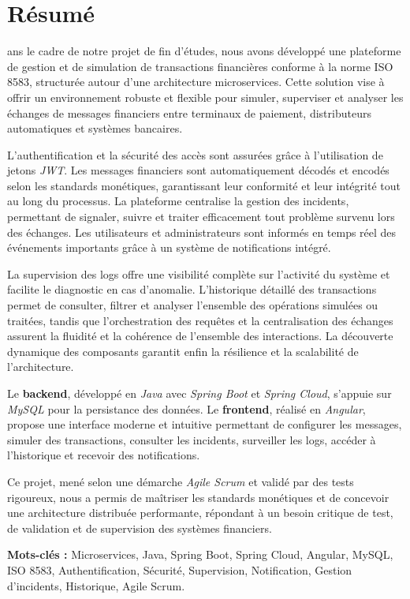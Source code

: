 \chapter*{Résumé}
\justifying
ans le cadre de notre projet de fin d’études, nous avons développé une plateforme de gestion et de simulation de transactions financières conforme à la norme ISO 8583, structurée autour d’une architecture microservices. Cette solution vise à offrir un environnement robuste et flexible pour simuler, superviser et analyser les échanges de messages financiers entre terminaux de paiement, distributeurs automatiques et systèmes bancaires.

L’authentification et la sécurité des accès sont assurées grâce à l’utilisation de jetons \textit{JWT}. Les messages financiers sont automatiquement décodés et encodés selon les standards monétiques, garantissant leur conformité et leur intégrité tout au long du processus. La plateforme centralise la gestion des incidents, permettant de signaler, suivre et traiter efficacement tout problème survenu lors des échanges. Les utilisateurs et administrateurs sont informés en temps réel des événements importants grâce à un système de notifications intégré. 

La supervision des logs offre une visibilité complète sur l’activité du système et facilite le diagnostic en cas d’anomalie. L’historique détaillé des transactions permet de consulter, filtrer et analyser l’ensemble des opérations simulées ou traitées, tandis que l’orchestration des requêtes et la centralisation des échanges assurent la fluidité et la cohérence de l’ensemble des interactions. La découverte dynamique des composants garantit enfin la résilience et la scalabilité de l’architecture.

Le \textbf{backend}, développé en \textit{Java} avec \textit{Spring Boot} et \textit{Spring Cloud}, s’appuie sur \textit{MySQL} pour la persistance des données. Le \textbf{frontend}, réalisé en \textit{Angular}, propose une interface moderne et intuitive permettant de configurer les messages, simuler des transactions, consulter les incidents, surveiller les logs, accéder à l’historique et recevoir des notifications.

Ce projet, mené selon une démarche \textit{Agile Scrum} et validé par des tests rigoureux, nous a permis de maîtriser les standards monétiques et de concevoir une architecture distribuée performante, répondant à un besoin critique de test, de validation et de supervision des systèmes financiers.

\vspace{0.4cm}
\noindent \textbf{Mots-clés :} Microservices, Java, Spring Boot, Spring Cloud, Angular, MySQL, ISO 8583, Authentification, Sécurité, Supervision, Notification, Gestion d’incidents, Historique, Agile Scrum.

